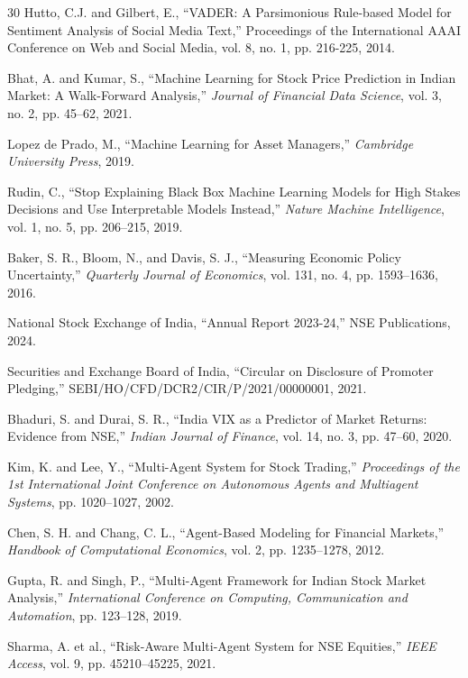 \documentclass[12pt,a4paper]{report}
\begin{document}
\begin{thebibliography}{30}
Hutto, C.J. and Gilbert, E., ``VADER: A Parsimonious Rule-based Model for Sentiment Analysis of Social Media Text,'' Proceedings of the International AAAI Conference on Web and Social Media, vol. 8, no. 1, pp. 216-225, 2014.

Bhat, A. and Kumar, S., ``Machine Learning for Stock Price Prediction in Indian Market: A Walk-Forward Analysis,'' \textit{Journal of Financial Data Science}, vol. 3, no. 2, pp. 45--62, 2021.

Lopez de Prado, M., ``Machine Learning for Asset Managers,'' \textit{Cambridge University Press}, 2019.

Rudin, C., ``Stop Explaining Black Box Machine Learning Models for High Stakes Decisions and Use Interpretable Models Instead,'' \textit{Nature Machine Intelligence}, vol. 1, no. 5, pp. 206--215, 2019.

Baker, S. R., Bloom, N., and Davis, S. J., ``Measuring Economic Policy Uncertainty,'' \textit{Quarterly Journal of Economics}, vol. 131, no. 4, pp. 1593--1636, 2016.

National Stock Exchange of India, ``Annual Report 2023-24,'' NSE Publications, 2024.

Securities and Exchange Board of India, ``Circular on Disclosure of Promoter Pledging,'' SEBI/HO/CFD/DCR2/CIR/P/2021/00000001, 2021.

Bhaduri, S. and Durai, S. R., ``India VIX as a Predictor of Market Returns: Evidence from NSE,'' \textit{Indian Journal of Finance}, vol. 14, no. 3, pp. 47--60, 2020.

Kim, K. and Lee, Y., ``Multi-Agent System for Stock Trading,'' \textit{Proceedings of the 1st International Joint Conference on Autonomous Agents and Multiagent Systems}, pp. 1020--1027, 2002.

Chen, S. H. and Chang, C. L., ``Agent-Based Modeling for Financial Markets,'' \textit{Handbook of Computational Economics}, vol. 2, pp. 1235--1278, 2012.

Gupta, R. and Singh, P., ``Multi-Agent Framework for Indian Stock Market Analysis,'' \textit{International Conference on Computing, Communication and Automation}, pp. 123--128, 2019.

Sharma, A. et al., ``Risk-Aware Multi-Agent System for NSE Equities,'' \textit{IEEE Access}, vol. 9, pp. 45210--45225, 2021.


\end{thebibliography}
\end{document}
